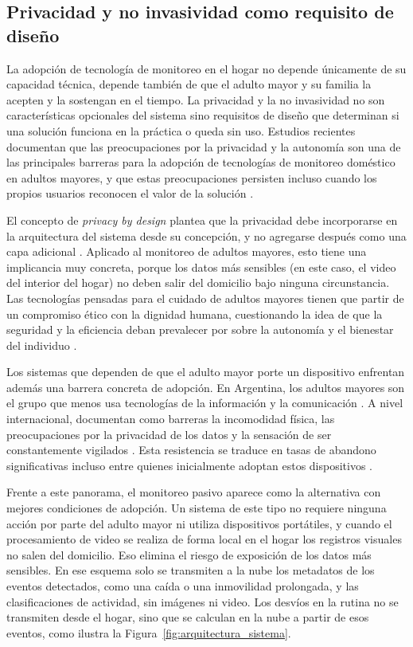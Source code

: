 \subsection{Privacidad y no invasividad como requisito de diseño}
\label{sec:privacidad_marco}

La adopción de tecnología de monitoreo en el hogar no depende únicamente de su capacidad técnica, depende también de que el adulto mayor y su familia la acepten y la sostengan en el tiempo.
La privacidad y la no invasividad no son características opcionales del sistema sino requisitos de diseño que determinan si una solución funciona en la práctica o queda sin uso.
Estudios recientes documentan que las preocupaciones por la privacidad y la autonomía son una de las principales barreras para la adopción de tecnologías de monitoreo doméstico en adultos mayores, y que estas preocupaciones persisten incluso cuando los propios usuarios reconocen el valor de la solución \parencite{PercyCampbell2024}.

El concepto de \textit{privacy by design} plantea que la privacidad debe incorporarse en la arquitectura del sistema desde su concepción, y no agregarse después como una capa adicional \parencite{Cavoukian2009}.
Aplicado al monitoreo de adultos mayores, esto tiene una implicancia muy concreta, porque los datos más sensibles (en este caso, el video del interior del hogar) no deben salir del domicilio bajo ninguna circunstancia.
Las tecnologías pensadas para el cuidado de adultos mayores tienen que partir de un compromiso ético con la dignidad humana, cuestionando la idea de que la seguridad y la eficiencia deban prevalecer por sobre la autonomía y el bienestar del individuo \parencite{Joseph2025}.

Los sistemas que dependen de que el adulto mayor porte un dispositivo enfrentan además una barrera concreta de adopción.
En Argentina, los adultos mayores son el grupo que menos usa tecnologías de la información y la comunicación \parencite{INDEC2020}.
A nivel internacional, \textcite{Lam2025} documentan como barreras la incomodidad física, las preocupaciones por la privacidad de los datos y la sensación de ser constantemente vigilados \parencite{Lam2025}.
Esta resistencia se traduce en tasas de abandono significativas incluso entre quienes inicialmente adoptan estos dispositivos \parencite{MunozEsquivel2023}.

Frente a este panorama, el monitoreo pasivo aparece como la alternativa con mejores condiciones de adopción.
Un sistema de este tipo no requiere ninguna acción por parte del adulto mayor ni utiliza dispositivos portátiles, y cuando el procesamiento de video se realiza de forma local en el hogar los registros visuales no salen del domicilio.
Eso elimina el riesgo de exposición de los datos más sensibles.
En ese esquema solo se transmiten a la nube los metadatos de los eventos detectados, como una caída o una inmovilidad prolongada, y las clasificaciones de actividad, sin imágenes ni video.
Los desvíos en la rutina no se transmiten desde el hogar, sino que se calculan en la nube a partir de esos eventos, como ilustra la Figura~\ref{fig:arquitectura_sistema}.

